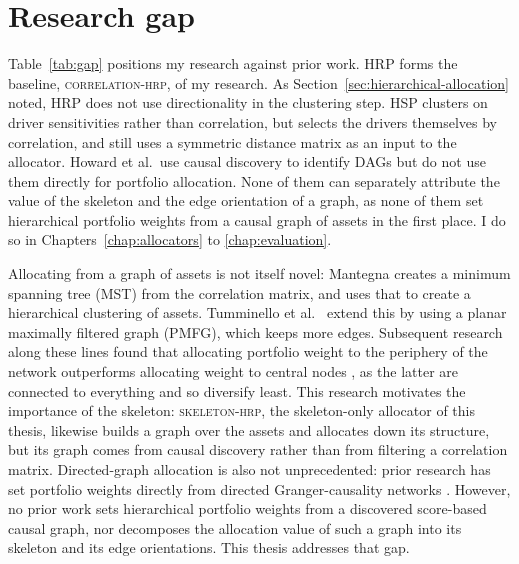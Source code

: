 \documentclass[11pt, a4paper]{report}
\newcommand{\corrhrp}{\textsc{correlation-hrp}}
\newcommand{\skelhrp}{\textsc{skeleton-hrp}}
\begin{document}
\section{Research gap}
\label{sec:gap}

Table~\ref{tab:gap} positions my research against prior work. HRP forms the baseline, \corrhrp{}, of my research. As Section~\ref{sec:hierarchical-allocation} noted, HRP does not use directionality in the clustering step. HSP clusters on driver sensitivities rather than correlation, but selects the drivers themselves by correlation, and still uses a symmetric distance matrix as an input to the allocator. Howard et al.\ use causal discovery to identify DAGs but do not use them directly for portfolio allocation. None of them can separately attribute the value of the skeleton and the edge orientation of a graph, as none of them set hierarchical portfolio weights from a causal graph of assets in the first place. I do so in Chapters~\ref{chap:allocators} to \ref{chap:evaluation}.

Allocating from a graph of assets is not itself novel: Mantegna \cite{mantegna1999hierarchical} creates a minimum spanning tree (MST) from the correlation matrix, and uses that to create a hierarchical clustering of assets. Tumminello et al.\
\cite{tumminello2005pmfg} extend this by using a planar maximally
filtered graph (PMFG), which keeps more edges.
Subsequent research along these lines found that allocating portfolio weight to the periphery of the network outperforms allocating weight to central nodes \cite{pozzi2013spread,peralta2016network}, as the latter are connected to everything and 
so diversify least. 
This research motivates the importance of the skeleton: \skelhrp{}, the skeleton-only
allocator of this thesis, likewise builds a graph over the assets and allocates down its
structure, but its graph comes from causal discovery rather than from
filtering a correlation matrix. 
Directed-graph allocation is also
not unprecedented: prior research has set portfolio weights directly
from directed Granger-causality networks \cite{vyrost2019network}.
However, no prior work sets hierarchical portfolio weights from a discovered score-based causal graph, nor decomposes the allocation value of such a
graph into its skeleton and its edge orientations. This thesis addresses that gap.
\end{document}
